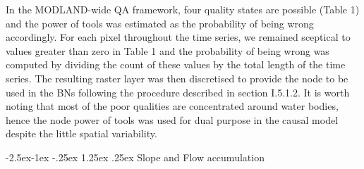 \documentclass[12pt,oneside]{article}
\makeatletter
\renewcommand\paragraph{\@startsection{paragraph}{4}{\z@}%
            {-2.5ex\@plus -1ex \@minus -.25ex}%
            {1.25ex \@plus .25ex}%
            {\normalfont\normalsize\bfseries}}
\makeatother
\begin{document}
In the MODLAND-wide QA framework, four quality states are possible
(Table 1) and the power of tools was estimated as the probability of
being wrong accordingly. For each pixel throughout the time series, we
remained sceptical to values greater than zero in Table 1 and the
probability of being wrong was computed by dividing the count of these
values by the total length of the time series. The resulting raster
layer was then discretised to provide the node to be used in the BNs
following the procedure described in section I.5.1.2. It is worth noting
that most of the poor qualities are concentrated around water bodies,
hence the node power of tools was used for dual purpose in the causal
model despite the little spatial variability.

\hypertarget{I.5.2.6}{%
\paragraph{Slope and Flow accumulation}\label{I.5.2.6}}
\end{document}
